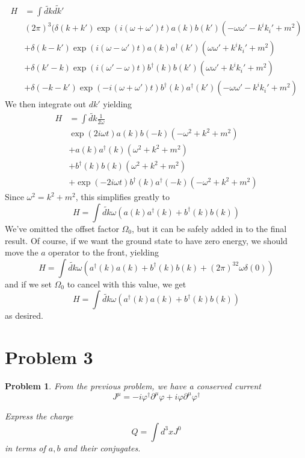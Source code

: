 \documentclass[fontsize=11pt]{scrartcl} %
\numberwithin{equation}{section} %
\numberwithin{figure}{section} %
\numberwithin{table}{section} %
\newtheorem*{problem}{Problem}
\begin{document}
\[
    \begin{aligned}
        H &=
        \int \tilde{dk}\tilde{dk'}\\
        &(2\pi)^3(\delta(k+k')\exp(i(\omega + \omega')t)a(k)b(k')\left( 
            -\omega\omega' - k^ik_i' + m^2
            \right)\\
            &+\delta(k-k')\exp(i(\omega-\omega')t)a(k)a^{\dagger}(k')\left( 
                \omega\omega' + k^ik_i' + m^2
            \right)\\
            &+\delta(k'-k)\exp(i(\omega'-\omega)t)b^{\dagger}(k)b(k')\left( 
                \omega\omega' + k^ik_i' + m^2
            \right)\\
            &+\delta(-k-k')\exp(-i(\omega +
            \omega')t)b^{\dagger}(k)a^{\dagger}(k')\left( 
                -\omega\omega' - k^ik_i' + m^2
            \right)
    \end{aligned}
\]
We then integrate out $dk'$ yielding
\[
\begin{aligned}
    H &= \int \tilde{dk}\frac{1}{2\omega}\\
    &\exp(2i\omega t)a(k)b(-k)\left( 
        -\omega^2 + k^2 + m^2
    \right)\\
    &+a(k)a^{\dagger}(k)\left( 
        \omega^2 + k^2 + m^2
    \right)\\
    &+b^{\dagger}(k)b(k)\left( 
        \omega^2 + k^2 + m^2
    \right)\\
    &+\exp(-2i\omega t)b^{\dagger}(k)a^{\dagger}(-k)\left( 
    -\omega^2 + k^2 + m^2
    \right)
\end{aligned}
\]
Since $\omega^2 = k^2 + m^2$, this simplifies greatly to
\[
    H = \int \tilde{dk}\omega\left( a(k)a^{\dagger}(k) + b^{\dagger}(k)b(k) \right)
\]
We've omitted the offset factor $\Omega_0$, but it can be safely added in to the
final result. Of course, if we want the ground state to have zero energy, we
should move the $a$ operator to the front, yielding
\[
    H = \int \tilde{dk}\omega\left( a^{\dagger}(k)a(k) + b^{\dagger}(k)b(k) +
    (2\pi)^32\omega \delta(0) \right)
\]
and if we set $\Omega_0$ to cancel with this value, we get
\[
    H = \int \tilde{dk}\omega\left( a^{\dagger}(k)a(k) + b^{\dagger}(k)b(k)
    \right)
\]
as desired.


\newpage

\section*{Problem 3}
\begin{problem}
    From the previous problem, we have a conserved current
    \[
        J^{\mu} = -i\varphi^{\dagger}\partial^{\mu}\varphi +
        i\varphi\partial^{\mu}\varphi^{\dagger}
    \]

    Express the charge
    \[
        Q = \int d^3x J^{0}
    \]
    in terms of $a,b$ and their conjugates.
\end{problem}
\end{document}
